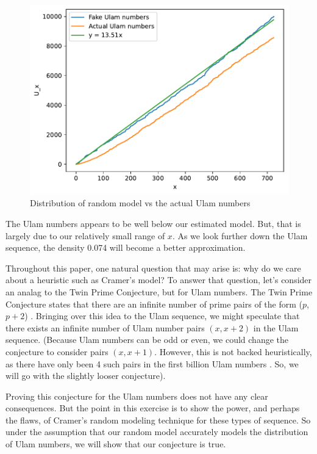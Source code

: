\documentclass[conference]{IEEEtran}
\begin{document}
\begin{figure}[H]
  \centering
  \includegraphics[width=\linewidth,keepaspectratio]{../images/Ulam_cramer.pdf}
  \caption{Distribution of random model vs the actual Ulam numbers}
\end{figure}

The Ulam numbers appears to be well below our estimated model. But, that is largely due to our relatively small range of $x$. As we look further down the Ulam sequence, the density 0.074 will become a better approximation.

Throughout this paper, one natural question that may arise is: why do we care about a heuristic such as Cramer's model? To answer that question, let's consider an analag to the Twin Prime Conjecture, but for Ulam numbers. The Twin Prime Conjecture states that there are an infinite number of prime pairs of the form ($p$, $p + 2$) \cite{b3}. Bringing over this idea to the Ulam sequence, we might speculate that there exists an infinite number of Ulam number pairs $(x, x + 2)$ in the Ulam sequence. (Because Ulam numbers can be odd or even, we could change the conjecture to consider pairs $(x, x + 1)$. However, this is not backed heuristically, as there have only been 4 such pairs in the first billion Ulam numbers \cite{b2}. So, we will go with the slightly looser conjecture). 

Proving this conjecture for the Ulam numbers does not have any clear consequences. But the point in this exercise is to show the power, and perhaps the flaws, of Cramer's random modeling technique for these types of sequence. So under the assumption that our random model accurately models the distribution of Ulam numbers, we will show that our conjecture is true.
\end{document}
